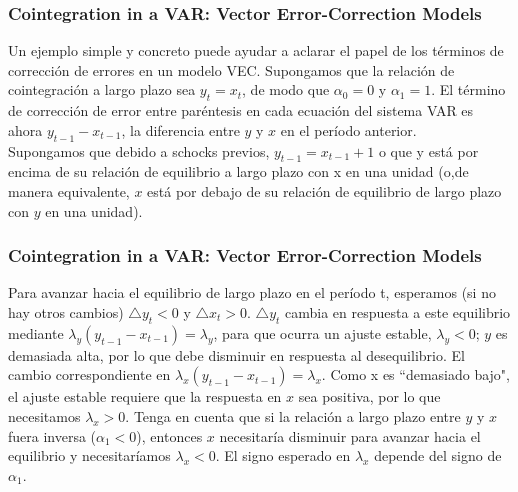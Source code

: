 \documentclass[spanish,xcolor=table]{beamer}
\begin{document}
\begin{frame}
\frametitle{Cointegration in a VAR: Vector Error-Correction Models}


Un ejemplo simple y concreto puede ayudar a aclarar el papel de los t\'erminos de correcci\'on de errores en un modelo VEC. Supongamos que la relaci\'on de cointegraci\'on a largo plazo sea $y_t = x_t$, de modo que $\alpha_0 = 0$ y $\alpha_1 = 1$. El t\'ermino de correcci\'on de error entre par\'entesis en cada ecuaci\'on del sistema VAR es ahora $y_{t -1} - x_{t -1}$, la diferencia entre $y$ y $x$ en el per\'{i}odo anterior. \\
Supongamos que debido a schocks previos, $y_{t -1} = x_{t -1} + 1$ o que y está por encima de su relaci\'on de equilibrio a largo plazo con x en una unidad (o,de manera equivalente, $x$ est\'a por debajo de su relaci\'on de equilibrio de largo plazo con $y$ en una unidad). \\


\end{frame}

\begin{frame}
\frametitle{Cointegration in a VAR: Vector Error-Correction Models}


Para avanzar hacia el equilibrio de largo plazo en el período t, esperamos (si no hay otros cambios) $\triangle y_t < 0$ y $\triangle x_t > 0$. $\triangle y_t$ cambia en respuesta a este equilibrio mediante $\lambda_y (y_{t-1} - x_{t-1}) = \lambda_y$, para que ocurra un ajuste estable, $\lambda_y < 0$; $y$ es demasiada alta, por lo que debe disminuir en respuesta al desequilibrio. El cambio correspondiente en $\lambda_x (y_{t-1} - x_{t-1}) = \lambda_x$. Como x es ``demasiado bajo", el ajuste estable requiere que la respuesta en $x$ sea positiva, por lo que necesitamos $\lambda_x > 0$. Tenga en cuenta que si la relaci\'on a largo plazo entre $y$ y $x$ fuera inversa ($\alpha_1 < 0$), entonces $x$ necesitar\'{i}a disminuir para avanzar hacia el equilibrio y necesitaríamos $\lambda_x < 0$. El signo esperado en $\lambda_x$ depende del signo de $\alpha_1$.

\end{frame}
\end{document}
